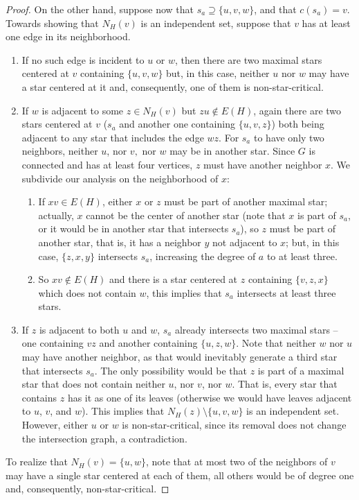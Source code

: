\begin{proof}
   On the other hand, suppose now that $s_a \supseteq \{u,v,w\}$, and that $c(s_a) = v$.
   Towards showing that $N_H(v)$ is an independent set, suppose that $v$ has at least one edge in its neighborhood.
   \begin{enumerate}\addtocounter{enumi}{2}
       \item If no such edge is incident to $u$ or $w$, then there are two maximal stars centered at $v$ containing $\{u,v,w\}$ but, in this case, neither $u$ nor $w$ may have a star centered at it and, consequently, one of them is non-star-critical. 
       \item If $w$ is adjacent to some $z \in N_H(v)$ but $zu \notin E(H)$, again there are two stars centered at $v$ ($s_a$ and another one containing $\{u,v,z\}$) both being adjacent to any star that includes the edge $wz$.
       For $s_a$ to have only two neighbors, neither $u$, nor $v,$ nor $w$ may be in another star.
       Since $G$ is connected and has at least four vertices, $z$ must have another neighbor $x$.
       We subdivide our analysis on the neighborhood of $x$:
       \begin{enumerate}
            \item If $xv \in E(H)$, either $x$ or $z$ must be part of another maximal star; actually, $x$ cannot be the center of another star (note that $x$ is part of $s_a$, or it would be in another star that intersects $s_a$), so $z$ must be part of another star, that is, it has a neighbor $y$ not adjacent to $x$; but, in this case, $\{z,x,y\}$ intersects $s_a$, increasing the degree of $a$ to at least three.
            \item So $xv \notin E(H)$ and there is a star centered at $z$ containing $\{v,z,x\}$ which does not contain $w$, this implies that $s_a$ intersects at least three stars.
       \end{enumerate}
       \item If $z$ is adjacent to both $u$ and $w$, $s_a$ already intersects two maximal stars -- one containing $vz$ and another containing $\{u,z,w\}$.
       Note that neither $w$ nor $u$ may have another neighbor, as that would inevitably generate a third star that intersects $s_a$.
       The only possibility would be that $z$ is part of a maximal star that does not contain neither $u$, nor $v$, nor $w$.
       That is, every star that contains $z$ has it as one of its leaves (otherwise we would have leaves adjacent to $u$, $v$, and $w$).
       This implies that $N_H(z) \setminus \{u,v,w\}$ is an independent set.
       However, either $u$ or $w$ is non-star-critical, since its removal does not change the intersection graph, a contradiction.
   \end{enumerate}
   To realize that $N_H(v) = \{u,w\}$, note that at most two of the neighbors of $v$ may have a single star centered at each of them, all others would be of degree one and, consequently, non-star-critical.
   

\end{proof}

